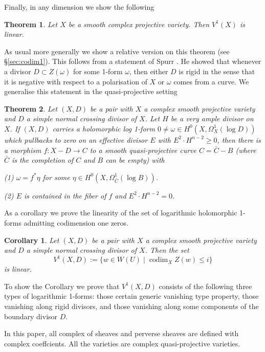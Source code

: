 \documentclass[12pt,reqno]{amsart}
\newtheorem{corollary}[theorem]{Corollary}
\newtheorem{alphtheorem}{Theorem}
\theoremstyle{question}
\theoremstyle{definition}
\theoremstyle{remark}
\theoremstyle{cited}
\theoremstyle{citeddef}
\DeclareMathOperator{\codim}{codim}              %
\begin{document}
Finally, in any dimension we show the following
\begin{alphtheorem}\label{thm:codim1}
Let $X$ be a smooth complex projective variety. Then $V^1(X)$ is linear.
\end{alphtheorem}
As usual more generally we show a relative version on this theorem (see \S \ref{sec:codim1}). This follows from
a statement of Spurr \cite[Theorem 2]{Sp88}. He showed that whenever a divisor $D\subset Z(\omega)$ for some 1-form $\omega$, then
either $D$ is rigid in the sense that it is negative with respect to a polarisation of $X$ or $\omega$ comes from a curve. We generalise this statement
in the quasi-projective setting
\begin{alphtheorem} \label{thm:spurr}
Let $(X, D)$ be a pair with $X$ a complex smooth projective variety and $D$ a simple normal crossing divisor of $X$. Let $H$ be a very ample divisor on $X$. If $(X, D)$ carries a holomorphic log 1-form $0\not=\omega\in H^0(X, \Omega_X^1(\log D))$  which pullbacks to zero on an effective divisor $E$ with $E^2\cdot H^{n-2}\geq0$, then there is a morphism $f: X-D\to C$ to a smooth quasi-projective curve $C=\bar{C}-B$ (where $\bar{C}$ is the completion of $C$ and $B$ can be empty) with 

(1)  $\omega=f^*\eta$ for some $\eta\in H^0(X, \Omega_{\bar{C}}^1(\log B))$.

(2) $E$ is contained in the fiber of $f$ and $E^2\cdot H^{n-2}=0$.
\end{alphtheorem}

As a corollary we prove the linearity of the set of logarithmic holomorphic 1-forms admitting codimension one zeros.

\begin{corollary}
Let $(X, D)$ be a pair with $X$ a complex smooth projective variety and $D$ a simple normal crossing divisor of $X$. Then the set $$ V^1(X,D):=\{ w \in W(U) \mid \codim_X Z(w) \leq i \}$$ is linear.
\end{corollary}

To show the Corollary we prove that $V^1(X,D)$ consists of the following three types of logarithmic 1-forms: those certain generic vanishing type property, those vanishing along rigid divisors, and those vanishing along some components of the boundary divisor $D$.









In this paper, all complex of sheaves and perverse sheaves are defined with complex
coeffcients. All the varieties are complex quasi-projective varieties. 
\end{document}
